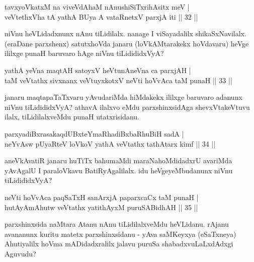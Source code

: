 \begin{shl}
tavxyoVkatxM na viveVdAhaM nAnushiSiTxrihAsitx meV | \\
veVtethxVha tA yathA BUya A vataRnetxV parxjA iti  \hfill|| 32 || 
\end{shl}

\begin{artha}
niVnu heVLidadxnunx nAnu tiLidilalx. nanage I viSayadalilx 
shikaSxNavilalx. (eraDane parxshenx) satutxhoVda janaru 
(loVkAMtarakekx hoVdavaru) heVge ililxge punaH baruvaro hAge niVnu 
tiLidididxVyA?
\end{artha}


\begin{shl}
yathA yeVna maqtAH satoyxV heVtunA\s neVna ca parxjAH | \\
taM veVtathx sivxnanx veVtuyxkotxV neVti hoVvAca taM punaH \hfill|| 33 || 
\end{shl}

\begin{artha}
janaru maqtapaTaTxvaru yAvudariMda hiMdakekx ililxge baruvaro adanunx 
niVnu tiLidididxVyA? athavA ilalxvo eMdu parxshinxsidAga shevxVtakeVtuvu 
ilalx, tiLidilalxveMdu punaH utatxrisidanu.
\end{artha}


\begin{shl}
parxyadiBxrasakaqdUBxteYmaRhadiBxbaRhuBiH sadA | \\
neYvAsw pUyaRteV loVkoV yathA veVtathx tathA\s tarx kimf \hfill|| 34 || 
\end{shl}

\begin{artha}
aneVkAvatiR janaru huTiTx bahumaMdi maraNahoMdidadxrU avariMda 
yAvAgalU I paraloVkavu BatiRyAgalilalx. idu heVgeyeMbudanunx niVnu 
tiLidididxVyA?
\end{artha}


\begin{shl}
neVti hoVvAca paqSaTxH sanArxjA paparxcaCx taM punaH | \\
hutAyAmAhutw veVtathx yatithAyxM puruSABidhAH \hfill|| 35 || 
\end{shl}

\begin{artha}
parxshinxsida naMtara Atanu nAnu tiLidilalxveMdu heVLidanu. rAjanu 
avananunx kuritu matetx parxshinxsidanu - yAva saMKeyxya (eSaTxneya) 
Ahutiyalilx hoVma mADidadxralilx jalavu puruSa shabadxvuLaLxdAdxgi 
Aguvudu?
\end{artha}

